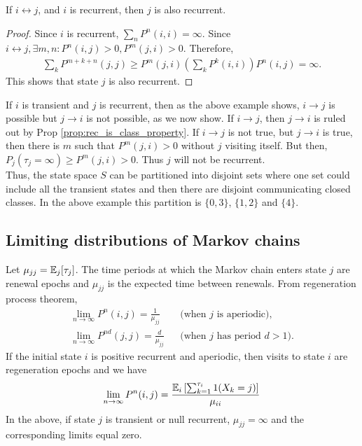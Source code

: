 \documentclass[all-lectures.tex]{subfiles}
\begin{document}
\begin{prop} \label{prop:rec_is_class_property}
If $i\leftrightarrow j$, and $i$ is recurrent, then $j$ is also recurrent.
\begin{proof}
Since $i$ is recurrent, $\sum_n P^n(i,i) = \infty$. Since $i\leftrightarrow j, \exists m,n : P^n(i,j) >0, P^m(j,i) >0$. Therefore,
\begin{align*}
\sum_k P^{m+k+n}(j,j) \geq  P^{m}(j,i) \left(\sum_k P^k(i,i)\right) P^{n}(i,j) = \infty.
\end{align*}
This shows that state $j$ is also recurrent.
\end{proof}
\end{prop}
If $i$ is transient and $j$ is recurrent, then as the above example shows, $i \rightarrow j$ is possible  but $j \rightarrow i$ is not possible, as we now show. If $i\rightarrow j$, then $j \rightarrow i$ is ruled out by Prop \ref{prop:rec_is_class_property}. If $i\rightarrow j$ is not true,  but $j \rightarrow i$ is true, then there is $m$ such that $P^m( j, i) >0$ without $j$ visiting itself. But then, $P_j(\tau_j= \infty) \geq P^m(j,i) >0$. Thus $j$ will not be recurrent. \\
\indent Thus, the state space $S$ can be partitioned into disjoint sets where one set could include all the transient states and then there are disjoint communicating closed classes. In the above example this partition is $\{0,3\}$, $\{1,2\}$ and  $\{4\}$.

\subsection{Limiting distributions of Markov chains}
Let $\mu_{jj} = \mathbb{E}_j[\tau_j]$. The time periods at which the Markov chain enters state $j$ are renewal epochs and $\mu_{jj}$ is the expected time between renewals. From regeneration process theorem,
\begin{align*}
\lim_{n\rightarrow \infty} P^n(i,j) = \frac{1}{\mu_{jj}} &&\text{(when $j$ is aperiodic)},\\
\lim_{n\rightarrow \infty} P^{nd}(j,j) = \frac{d}{\mu_{jj}} &&\text{(when $j$ has period $d> 1$).} 
\end{align*}
If the initial state $i$ is positive recurrent and aperiodic, then visits to state $i$ are regeneration epochs and we have 
\begin{align*}
\lim_{n\rightarrow \infty} P^n(i,j) = \frac{\mathbb{E}_i\left[\sum_{k=1}^{\tau_i} 1(X_k=j)\right]}{\mu_{ii}} 
\end{align*}
In the above, if state $j$ is transient or null recurrent, $\mu_{jj} = \infty$ and the corresponding limits equal zero. 
\end{document}
